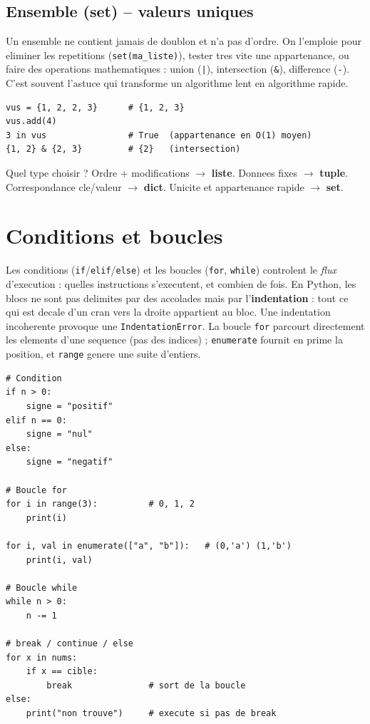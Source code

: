 \documentclass[11pt,a4paper]{article}
\begin{document}
\subsection{Ensemble (set) -- valeurs uniques}
Un ensemble ne contient jamais de doublon et n'a pas d'ordre. On l'emploie pour
eliminer les repetitions (\texttt{set(ma\_liste)}), tester tres vite une
appartenance, ou faire des operations mathematiques : union (\texttt{|}),
intersection (\texttt{\&}), difference (\texttt{-}). C'est souvent l'astuce qui
transforme un algorithme lent en algorithme rapide.

\begin{lstlisting}
vus = {1, 2, 2, 3}      # {1, 2, 3}
vus.add(4)
3 in vus                # True  (appartenance en O(1) moyen)
{1, 2} & {2, 3}         # {2}   (intersection)
\end{lstlisting}

\begin{infobox}{Quel type choisir ?}
Ordre + modifications $\rightarrow$ \textbf{liste}. Donnees fixes $\rightarrow$
\textbf{tuple}. Correspondance cle/valeur $\rightarrow$ \textbf{dict}. Unicite et
appartenance rapide $\rightarrow$ \textbf{set}.
\end{infobox}

\section{Conditions et boucles}
Les conditions (\texttt{if}/\texttt{elif}/\texttt{else}) et les boucles
(\texttt{for}, \texttt{while}) controlent le \emph{flux} d'execution : quelles
instructions s'executent, et combien de fois. En Python, les blocs ne sont pas
delimites par des accolades mais par l'\textbf{indentation} : tout ce qui est
decale d'un cran vers la droite appartient au bloc. Une indentation incoherente
provoque une \texttt{IndentationError}. La boucle \texttt{for} parcourt
directement les elements d'une sequence (pas des indices) ; \texttt{enumerate}
fournit en prime la position, et \texttt{range} genere une suite d'entiers.

\begin{lstlisting}
# Condition
if n > 0:
    signe = "positif"
elif n == 0:
    signe = "nul"
else:
    signe = "negatif"

# Boucle for
for i in range(3):          # 0, 1, 2
    print(i)

for i, val in enumerate(["a", "b"]):   # (0,'a') (1,'b')
    print(i, val)

# Boucle while
while n > 0:
    n -= 1

# break / continue / else
for x in nums:
    if x == cible:
        break               # sort de la boucle
else:
    print("non trouve")     # execute si pas de break
\end{lstlisting}
\end{document}
